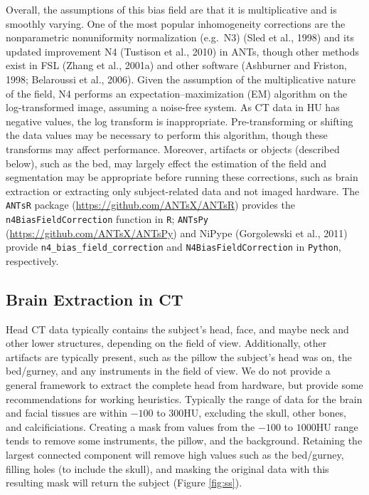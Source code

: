 \documentclass[utf8]{frontiersSCNS}
\begin{document}
Overall, the assumptions of this bias field are that it is multiplicative and is smoothly varying. One of the most popular inhomogeneity corrections are the nonparametric nonuniformity normalization (e.g.~N3) (Sled et al., 1998) and its updated improvement N4 (Tustison et al., 2010) in ANTs, though other methods exist in FSL (Zhang et al., 2001a) and other software (Ashburner and Friston, 1998; Belaroussi et al., 2006). Given the assumption of the multiplicative nature of the field, N4 performs an expectation--maximization (EM) algorithm on the log-transformed image, assuming a noise-free system. As CT data in HU has negative values, the log transform is inappropriate. Pre-transforming or shifting the data values may be necessary to perform this algorithm, though these transforms may affect performance. Moreover, artifacts or objects (described below), such as the bed, may largely effect the estimation of the field and segmentation may be appropriate before running these corrections, such as brain extraction or extracting only subject-related data and not imaged hardware. The \texttt{ANTsR} package (\url{https://github.com/ANTsX/ANTsR}) provides the \texttt{n4BiasFieldCorrection} function in \texttt{R}; \texttt{ANTsPy} (\url{https://github.com/ANTsX/ANTsPy}) and NiPype (Gorgolewski et al., 2011) provide \texttt{n4\_bias\_field\_correction} and
\texttt{N4BiasFieldCorrection} in \texttt{Python}, respectively.

\hypertarget{brain-extraction-in-ct}{%
\subsection{Brain Extraction in CT}\label{brain-extraction-in-ct}}

Head CT data typically contains the subject's head, face, and maybe neck and other lower structures, depending on the field of view. Additionally, other artifacts are typically present, such as the pillow the subject's head was on, the bed/gurney, and any instruments in the field of view. We do not provide a general framework to extract the complete head from hardware, but provide some recommendations for working heuristics. Typically the range of data for the brain and facial tissues are within \(-100\) to \(300\)HU, excluding the skull, other bones, and calcificiations. Creating a mask from values from the \(-100\) to \(1000\)HU range tends to remove some instruments, the pillow, and the background. Retaining the largest connected component will remove high values such as the bed/gurney, filling holes (to include the skull), and masking the original data with this resulting mask will return the subject (Figure \ref{fig:ss}).
\end{document}
